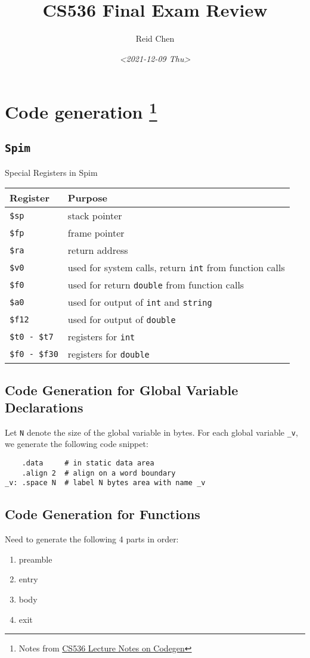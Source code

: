 \documentclass[11pt]{article}
\author{Reid Chen}
\date{\textit{<2021-12-09 Thu>}}
\title{CS536 Final Exam Review}
\begin{document}
\maketitle
\tableofcontents


\section{Code generation \footnote{Notes from \href{https://pages.cs.wisc.edu/\~aws/courses/cs536/readings/codegen.html}{CS536 Lecture Notes on Codegen}}}
\label{sec:org9a67eca}
\subsection{\texttt{Spim}}
\label{sec:orgb9d4291}
Special Registers in Spim
\begin{center}
\begin{tabular}{ll}
Register & Purpose\\
\hline
\texttt{\$sp} & stack pointer\\
\texttt{\$fp} & frame pointer\\
\texttt{\$ra} & return address\\
\texttt{\$v0} & used for system calls, return \texttt{int} from function calls\\
\texttt{\$f0} & used for return \texttt{double} from function calls\\
\texttt{\$a0} & used for output of \texttt{int} and \texttt{string}\\
\texttt{\$f12} & used for output of \texttt{double}\\
\texttt{\$t0 - \$t7} & registers for \texttt{int}\\
\texttt{\$f0 - \$f30} & registers for \texttt{double}\\
\end{tabular}
\end{center}
\subsection{Code Generation for Global Variable Declarations}
\label{sec:org6076987}
Let \texttt{N} denote the size of the global variable in bytes. For each global variable \texttt{\_v}, we
generate the following code snippet:
\begin{verbatim}
    .data     # in static data area
    .align 2  # align on a word boundary
_v: .space N  # label N bytes area with name _v
\end{verbatim}
\subsection{Code Generation for Functions}
\label{sec:org7675030}
Need to generate the following 4 parts in order:
\begin{enumerate}
\item preamble
\item entry
\item body
\item exit
\end{enumerate}
\end{document}
